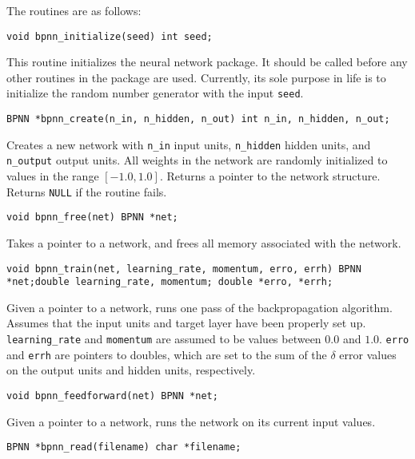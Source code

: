 The routines are as follows:

\begin{description}
\item {\tt void bpnn\_initialize(seed)\newline
int seed;}

This routine initializes the neural network package.  It should be
called before any other routines in the package are used.  Currently,
its sole purpose in life is to initialize the random number generator
with the input {\tt seed}.

\item {\tt BPNN *bpnn\_create(n\_in, n\_hidden, n\_out)\newline
int n\_in, n\_hidden, n\_out;}

Creates a new network with {\tt n\_in} input units, {\tt n\_hidden} hidden
units, and {\tt n\_output} output units.  All weights in the network
are randomly initialized to values in the range $[-1.0, 1.0]$.  Returns
a pointer to the network structure.  Returns {\tt NULL} if the routine
fails.

\item {\tt void bpnn\_free(net)\newline
BPNN *net;}

Takes a pointer to a network, and frees all memory associated with
the network.

\item {\tt void bpnn\_train(net, learning\_rate, momentum, erro, errh)\newline
BPNN *net;\newline double learning\_rate, momentum;\newline
double *erro, *errh;}

Given a pointer to a network, runs one pass of the backpropagation algorithm.
Assumes that the input units and target layer have been properly set up.
{\tt learning\_rate} and {\tt momentum} are assumed to be values between
$0.0$ and $1.0$.  {\tt erro} and {\tt errh} are pointers to doubles, which
are set to the sum of the $\delta$ error values on the output units
and hidden units, respectively.

\item {\tt void bpnn\_feedforward(net)\newline
BPNN *net;}

Given a pointer to a network, runs the network on its current input
values.

\item {\tt BPNN *bpnn\_read(filename)\newline
char *filename;}


\end{description}
